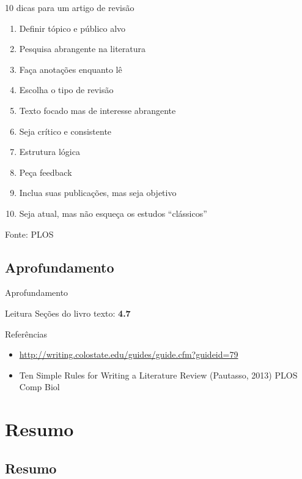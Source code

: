 \documentclass{beamer}
\begin{document}
\begin{frame}{10 dicas para um artigo de revisão}
  \begin{enumerate}
  \item Definir tópico e público alvo
  \item Pesquisa abrangente na literatura
  \item Faça anotações enquanto lê
  \item Escolha o tipo de revisão
  \item Texto focado mas de interesse abrangente
  \item Seja crítico e consistente
  \item Estrutura lógica
  \item Peça feedback
  \item Inclua suas publicações, mas seja objetivo
  \item Seja atual, mas não esqueça os estudos ``clássicos''
  \end{enumerate}
Fonte: PLOS
\end{frame}

\subsection{Aprofundamento}

\begin{frame}{Aprofundamento}
    \begin{block}{Leitura}
    Seções do livro texto: {\bf 4.7}
  \end{block}
\end{frame}

\begin{frame}{Referências}
  \begin{itemize}
  \item<1->
    \url{http://writing.colostate.edu/guides/guide.cfm?guideid=79}
  \item<1-> Ten Simple Rules for Writing a Literature Review
    (Pautasso, 2013) PLOS Comp Biol
  \end{itemize}
\end{frame}

\section{Resumo}

\subsection{Resumo}
\end{document}
